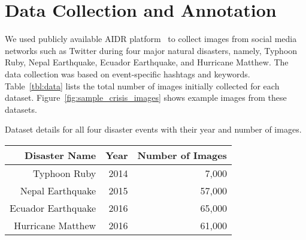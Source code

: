 \documentclass{iscram}
\begin{document}
\section{Data Collection and Annotation}\label{sec:datasets}%
We used publicly available AIDR platform~\parencite{imran2014aidr} to collect images from social media networks such as Twitter during four major natural disasters, namely, Typhoon Ruby, Nepal Earthquake, Ecuador Earthquake, and Hurricane Matthew. The data collection was based on event-specific hashtags and keywords.
Table~\ref{tbl:data} lists the total number of images initially collected for each dataset. Figure~\ref{fig:sample_crisis_images} shows example images from these datasets. %
\caption{Dataset details for all four disaster events with their year and number of images.}
\centering
\begin{tabular}{rrr}
\toprule
 Disaster Name & Year & Number of Images\\
\midrule
Typhoon Ruby &2014 & 7,000 \\
Nepal Earthquake & 2015 & 57,000\\
Ecuador Earthquake &2016 & 65,000 \\
Hurricane Matthew &2016  & 61,000\\
\bottomrule
\end{tabular}
\label{tbl:data}
\end{document}
